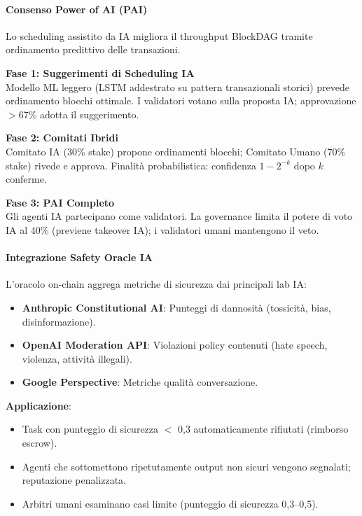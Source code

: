 \documentclass[11pt]{article}
\begin{document}
\paragraph{Consenso Power of AI (PAI)}
Lo scheduling assistito da IA migliora il throughput BlockDAG tramite ordinamento predittivo delle transazioni.

\textbf{Fase 1: Suggerimenti di Scheduling IA}\\
Modello ML leggero (LSTM addestrato su pattern transazionali storici) prevede ordinamento blocchi ottimale. I validatori votano sulla proposta IA; approvazione $>$67\% adotta il suggerimento.

\textbf{Fase 2: Comitati Ibridi}\\
Comitato IA (30\% stake) propone ordinamenti blocchi; Comitato Umano (70\% stake) rivede e approva. Finalità probabilistica: confidenza $1 - 2^{-k}$ dopo $k$ conferme.

\textbf{Fase 3: PAI Completo}\\
Gli agenti IA partecipano come validatori. La governance limita il potere di voto IA al 40\% (previene takeover IA); i validatori umani mantengono il veto.

\paragraph{Integrazione Safety Oracle IA}
L'oracolo on-chain aggrega metriche di sicurezza dai principali lab IA:
\begin{itemize}[noitemsep]
  \item \textbf{Anthropic Constitutional AI}: Punteggi di dannosità (tossicità, bias, disinformazione).
  \item \textbf{OpenAI Moderation API}: Violazioni policy contenuti (hate speech, violenza, attività illegali).
  \item \textbf{Google Perspective}: Metriche qualità conversazione.
\end{itemize}

\textbf{Applicazione}:
\begin{itemize}[noitemsep]
  \item Task con punteggio di sicurezza $<$ 0,3 automaticamente rifiutati (rimborso escrow).
  \item Agenti che sottomettono ripetutamente output non sicuri vengono segnalati; reputazione penalizzata.
  \item Arbitri umani esaminano casi limite (punteggio di sicurezza 0,3--0,5).
\end{itemize}
\end{document}
